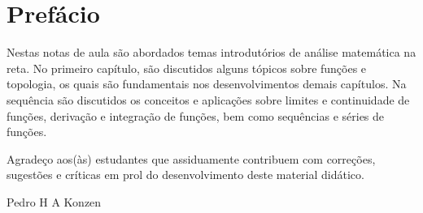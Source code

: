 
\chapter*{Prefácio}\label{c_prefacio}

Nestas notas de aula são abordados temas introdutórios de análise matemática na reta. No primeiro capítulo, são discutidos alguns tópicos sobre funções e topologia, os quais são fundamentais nos desenvolvimentos demais capítulos. Na sequência são discutidos os conceitos e aplicações sobre limites e continuidade de funções, derivação e integração de funções, bem como sequências e séries de funções.

Agradeço aos(às) estudantes que assiduamente contribuem com correções, sugestões e críticas em prol do desenvolvimento deste material didático.

\begin{flushright}
  Pedro H A Konzen
\end{flushright}